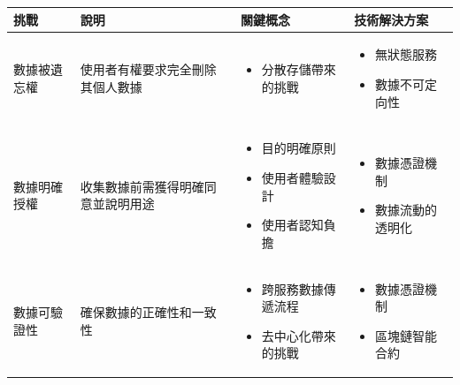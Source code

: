 \begin{table}
  \centering
  \begin{tabular}{>{\raggedright\arraybackslash}p{2.5cm}>{\raggedright\arraybackslash}p{2.5cm}>{\raggedright\arraybackslash}p{4cm}>{\raggedright\arraybackslash}p{4cm}}
    \toprule
    \textbf{挑戰}                         & \textbf{說明}       & \textbf{關鍵概念} & \textbf{技術解決方案} \\
    \midrule
    數據被遺忘權                              & 使用者有權要求完全刪除其個人數據  &
    \begin{itemize}[nosep,leftmargin=*]
      \item 分散存儲帶來的挑戰
    \end{itemize} &
    \begin{itemize}[nosep,leftmargin=*]
      \item 無狀態服務
      \item 數據不可定向性
    \end{itemize}                                                        \\
    \addlinespace
    數據明確授權                              & 收集數據前需獲得明確同意並說明用途 &
    \begin{itemize}[nosep,leftmargin=*]
      \item 目的明確原則
      \item 使用者體驗設計
      \item 使用者認知負擔
    \end{itemize} &
    \begin{itemize}[nosep,leftmargin=*]
      \item 數據憑證機制
      \item 數據流動的透明化
    \end{itemize}                                                        \\
    \addlinespace
    數據可驗證性                              & 確保數據的正確性和一致性      &
    \begin{itemize}[nosep,leftmargin=*]
      \item 跨服務數據傳遞流程
      \item 去中心化帶來的挑戰
    \end{itemize} &
    \begin{itemize}[nosep,leftmargin=*]
      \item 數據憑證機制
      \item 區塊鏈智能合約
    \end{itemize}                                                        \\

\end{tabular}
\end{table}
